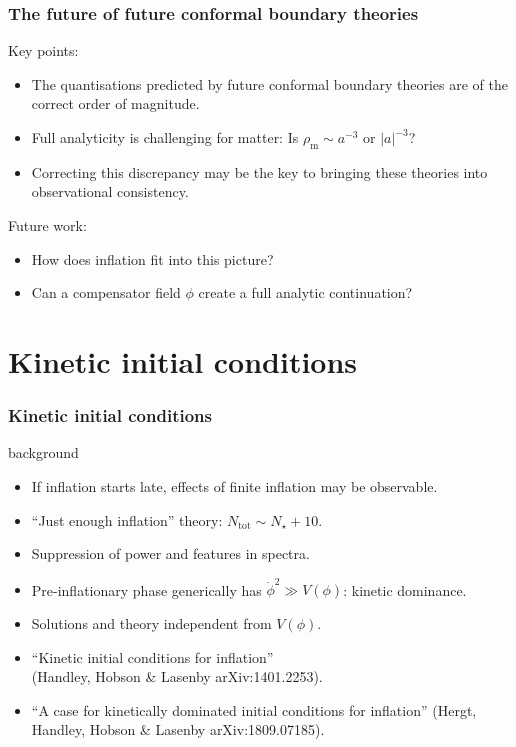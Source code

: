 \documentclass[%
]{beamer}
\begin{document}
\begin{frame}
    \frametitle{The future of future conformal boundary theories}
    Key points:
    \begin{itemize}
        \item The quantisations predicted by future conformal boundary theories are of the correct order of magnitude.
        \item Full analyticity is challenging for matter: Is $\rho_\mathrm{m}\sim a^{-3}\text{ or }|a|^{-3}$?
        \item Correcting this discrepancy may be the key to bringing these theories into observational consistency.
    \end{itemize}
    \vspace{10pt}
    Future work:
    \begin{itemize}
        \item How does inflation fit into this picture?
        \item Can a compensator field $\phi$ create a full analytic continuation?
    \end{itemize}
\end{frame}

\section{Kinetic initial conditions}
\begin{frame}
    \frametitle{Kinetic initial conditions}
    \begin{figright}[0.67]{background}
        \begin{itemize}
            \item If inflation starts late, effects of finite inflation may be observable.
            \item ``Just enough inflation'' theory: $N_\mathrm{tot}\sim N_\star+10$.
            \item Suppression of power and features in spectra.
            \item Pre-inflationary phase generically has $\dot\phi^2\gg V(\phi)$: kinetic dominance.
            \item Solutions and theory independent from $V(\phi)$.
            \item ``Kinetic initial conditions for inflation''\\ (Handley, Hobson \& Lasenby arXiv:1401.2253).
            \item ``A case for kinetically dominated initial conditions for inflation'' (Hergt, Handley, Hobson \& Lasenby arXiv:1809.07185).
        \end{itemize}
    \end{figright}
\end{frame}
\end{document}
